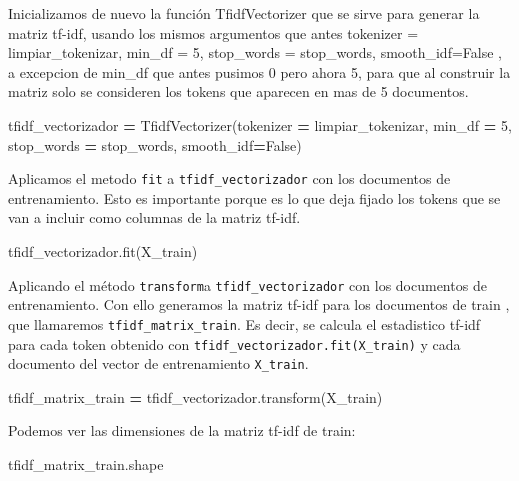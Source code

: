 \documentclass[
  11pt,
  a4paper,
]{article}
\newenvironment{Shaded}{\begin{snugshade}}{\end{snugshade}}
\newcommand{\DecValTok}[1]{\textcolor[rgb]{0.00,0.00,0.81}{#1}}
\newcommand{\NormalTok}[1]{#1}
\newcommand{\OperatorTok}[1]{\textcolor[rgb]{0.81,0.36,0.00}{\textbf{#1}}}
\newcommand{\VariableTok}[1]{\textcolor[rgb]{0.00,0.00,0.00}{#1}}
\begin{document}
Inicializamos de nuevo la función TfidfVectorizer que se sirve para
generar la matriz tf-idf, usando los mismos argumentos que antes
tokenizer = limpiar\_tokenizar, min\_df = 5, stop\_words = stop\_words,
smooth\_idf=False , a excepcion de min\_df que antes pusimos 0 pero
ahora 5, para que al construir la matriz solo se consideren los tokens
que aparecen en mas de 5 documentos.

\begin{Shaded}
\begin{Highlighting}[]
\NormalTok{tfidf\_vectorizador }\OperatorTok{=}\NormalTok{ TfidfVectorizer(tokenizer  }\OperatorTok{=}\NormalTok{ limpiar\_tokenizar, min\_df }\OperatorTok{=} \DecValTok{5}\NormalTok{, stop\_words }\OperatorTok{=}\NormalTok{ stop\_words, smooth\_idf}\OperatorTok{=}\VariableTok{False}\NormalTok{)}
\end{Highlighting}
\end{Shaded}

Aplicamos el metodo \texttt{fit} a \texttt{tfidf\_vectorizador} con los
documentos de entrenamiento. Esto es importante porque es lo que deja
fijado los tokens que se van a incluir como columnas de la matriz
tf-idf.

\begin{Shaded}
\begin{Highlighting}[]

\NormalTok{tfidf\_vectorizador.fit(X\_train)}
\end{Highlighting}
\end{Shaded}

Aplicando el método \texttt{transform}a \texttt{tfidf\_vectorizador} con
los documentos de entrenamiento. Con ello generamos la matriz tf-idf
para los documentos de train , que llamaremos
\texttt{tfidf\_matrix\_train}. Es decir, se calcula el estadistico
tf-idf para cada token obtenido con
\texttt{tfidf\_vectorizador.fit(X\_train)} y cada documento del vector
de entrenamiento \texttt{X\_train}.

\begin{Shaded}
\begin{Highlighting}[]

\NormalTok{tfidf\_matrix\_train }\OperatorTok{=}\NormalTok{ tfidf\_vectorizador.transform(X\_train)}
\end{Highlighting}
\end{Shaded}

Podemos ver las dimensiones de la matriz tf-idf de train:

\begin{Shaded}
\begin{Highlighting}[]
\NormalTok{tfidf\_matrix\_train.shape}
\end{Highlighting}
\end{Shaded}
\end{document}
